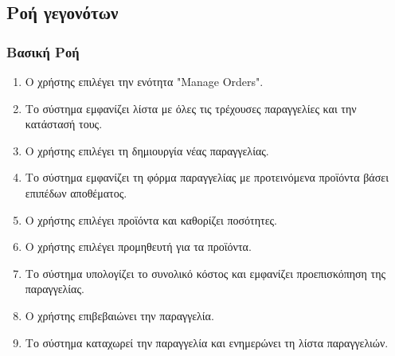 \documentclass[12pt,a4paper,twoside]{book}
\begin{document}
\subsection{Ροή γεγονότων}

\subsubsection{Βασική Ροή}
\begin{enumerate}
  \item Ο χρήστης επιλέγει την ενότητα "Manage Orders". %
  \item Το σύστημα εμφανίζει λίστα με όλες τις τρέχουσες παραγγελίες και την κατάστασή τους.
  \item Ο χρήστης επιλέγει τη δημιουργία νέας παραγγελίας.
  \item Το σύστημα εμφανίζει τη φόρμα παραγγελίας με προτεινόμενα προϊόντα βάσει επιπέδων αποθέματος.
  \item Ο χρήστης επιλέγει προϊόντα και καθορίζει ποσότητες.
  \item Ο χρήστης επιλέγει προμηθευτή για τα προϊόντα.
  \item Το σύστημα υπολογίζει το συνολικό κόστος και εμφανίζει προεπισκόπηση της παραγγελίας.
  \item Ο χρήστης επιβεβαιώνει την παραγγελία.
  \item Το σύστημα καταχωρεί την παραγγελία και ενημερώνει τη λίστα παραγγελιών.
\end{enumerate}
\end{document}
